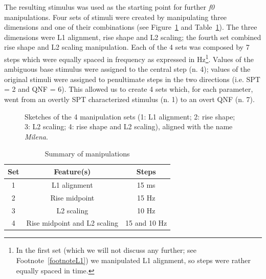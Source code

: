 The resulting stimulus was used as the starting point for further \textit{f0} manipulations. Four sets of stimuli were created by manipulating three dimensions and one of their combinations (see Figure~\ref{fig304} and Table~\ref{tab31}). The three dimensions were L1 alignment, rise shape and L2 scaling; the fourth set combined rise shape and L2 scaling manipulation. Each of the 4 sets was composed by 7 steps which were equally spaced in frequency as expressed in Hz\footnote{In the first set (which we will not discuss any further; see Footnote~\ref{footnoteL1}) we manipulated L1 alignment, so steps were rather equally spaced in time.}. Values of the ambiguous base stimulus were assigned to the central step (n. 4); values of the original stimuli were assigned to penultimate steps in the two directions (i.e. SPT = 2 and QNF = 6). This allowed us to create 4 sets which, for each parameter, went from an overtly SPT characterized stimulus (n. 1) to an overt QNF (n. 7). 

\begin{figure}
\centering
{}
\caption{Sketches of the 4 manipulation sets (1: L1 alignment; 2: rise shape; 3: L2 scaling; 4: rise shape and L2 scaling), aligned with the name \textit{Milena}.}
\label{fig304}\end{figure}

\begin{table}[h]
\centering
\begin{tabular}{c c c}
Set & Feature(s) & Steps \\
\hline
1 & L1 alignment & 15 ms \\
2 & Rise midpoint & 15 Hz \\
3 & L2 scaling & 10 Hz \\
4 & Rise midpoint and L2 scaling & 15 and 10 Hz \\
\end{tabular}
\caption{Summary of manipulations}
\label{tab31}\end{table}

